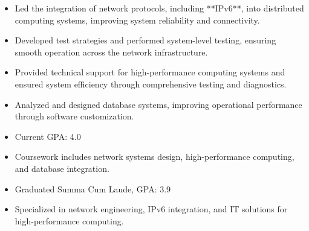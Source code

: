 \par\smallskip
\noindent
\begin{minipage}{20cm}
  \begin{minipage}{9.75cm}
    \begin{itemize}
      \item Led the integration of network protocols, including **IPv6**, into distributed computing systems, improving system reliability and connectivity.
      \item Developed test strategies and performed system-level testing, ensuring smooth operation across the network infrastructure.
    \end{itemize}
  \end{minipage}
  \hfill
  \begin{minipage}{9.75cm}
    \begin{itemize}
      \item Provided technical support for high-performance computing systems and ensured system efficiency through comprehensive testing and diagnostics.
      \item Analyzed and designed database systems, improving operational performance through software customization.
    \end{itemize}
  \end{minipage}
\end{minipage}

\begin{itemize}
  \item Current GPA: 4.0
  \item Coursework includes network systems design, high-performance computing, and database integration.
\end{itemize}
\divider

\begin{itemize}
  \item Graduated Summa Cum Laude, GPA: 3.9
  \item Specialized in network engineering, IPv6 integration, and IT solutions for high-performance computing.
\end{itemize}

\noindent
\begin{minipage}{20cm}
\end{minipage}

